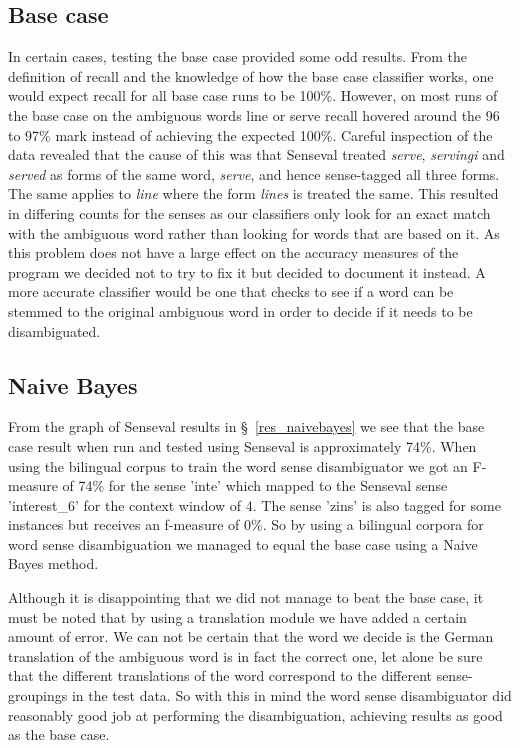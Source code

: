\documentclass[a4wide,10pt]{article}
\begin{document}
\subsection{Base case}
In certain cases, testing the base case provided some odd results.
From the definition of recall and the knowledge of how the
base case classifier works, one would expect recall for all base case runs to be
100\%.  However, on most runs of the base case on the ambiguous words line or
serve recall hovered around the 96 to 97\% mark instead of achieving the
expected 100\%.  Careful inspection of the data revealed that the cause of this
was that Senseval treated {\it serve}, {\it servingi} and {\it served} as forms
of the same word, {\it serve}, and hence sense-tagged all three forms.  The
same applies to {\it line} where the form {\it lines} is treated the same.  
This resulted
in differing counts for the senses as our classifiers only look for an
exact match with the ambiguous word rather than looking for words that
are based on it.  As this problem does not have a large effect on the
accuracy measures of the program we decided not to try to fix it but
decided to document it instead.  A more accurate classifier would be one that
checks to see if a word can be stemmed to the original ambiguous word in order
to decide if it needs to be disambiguated.

\subsection{Naive Bayes}
From the graph of Senseval results
in \S~\ref{res_naivebayes} we see that the base case result when
run and tested using Senseval is approximately 74\%.
When using the bilingual corpus to train the word sense disambiguator
we got an F-measure of 74\% for the sense 'inte' which mapped to the
Senseval sense 'interest\_6' for the context window of 4.
The sense 'zins' is also tagged for some instances but receives an f-measure of
0\%.
So by using a bilingual corpora for word sense disambiguation we managed
to equal the base case using a Naive Bayes method.

Although it is disappointing that we did not manage to beat the base case,
it must be noted that by using a translation
module we have added a certain amount of error.  We can not be certain that
the word we decide is the German translation of the ambiguous word is in fact
the correct one, let alone be sure that the different translations of the
word correspond to the different sense-groupings in the test data.
So with this in mind the word sense disambiguator did reasonably good job
at performing the disambiguation, achieving results as good as
the base case.
\end{document}
